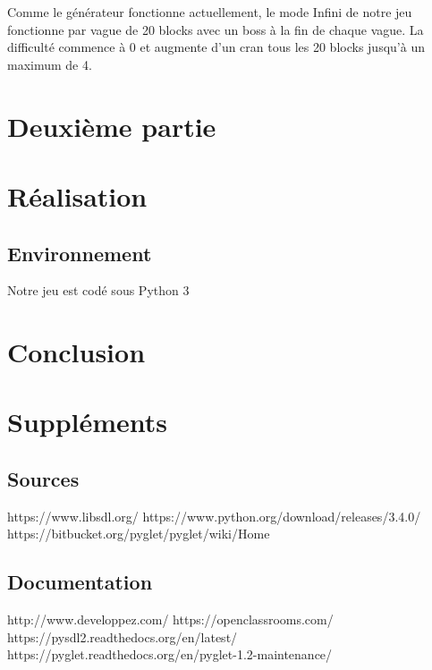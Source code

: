 \documentclass{article}
\begin{document}
Comme le générateur fonctionne actuellement, le mode Infini de notre jeu
fonctionne par vague de 20 blocks avec un boss à la fin de chaque vague. La
difficulté commence à 0 et augmente d'un cran tous les 20 blocks jusqu'à un
maximum de 4.

\section{Deuxième partie}

\section{Réalisation}

\subsection{Environnement}

Notre jeu est codé sous Python 3

\section{Conclusion}

\section{Suppléments}

\subsection{Sources}

\noindent https://www.libsdl.org/
\newline https://www.python.org/download/releases/3.4.0/
\newline https://bitbucket.org/pyglet/pyglet/wiki/Home

\subsection{Documentation}

\noindent http://www.developpez.com/
\newline https://openclassrooms.com/
\newline https://pysdl2.readthedocs.org/en/latest/
\newline https://pyglet.readthedocs.org/en/pyglet-1.2-maintenance/
\end{document}
